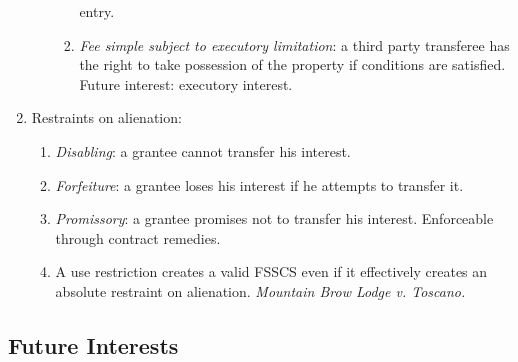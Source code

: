 \begin{enumerate}
\begin{enumerate}
\begin{enumerate}
            entry.
            \item \emph{Fee simple subject to executory limitation}: a third 
            party transferee has the right to take possession of the property 
            if conditions are satisfied. Future interest: executory interest.
        \end{enumerate}
    \end{enumerate}
    \item Restraints on alienation:
    \begin{enumerate}
        \item \emph{Disabling}: a grantee cannot transfer his interest.
        \item \emph{Forfeiture}: a grantee loses his interest if he attempts 
        to transfer it.
        \item \emph{Promissory}: a grantee promises not to transfer his 
        interest. Enforceable through contract remedies.
        \item A use restriction creates a valid FSSCS even if it effectively 
        creates an absolute restraint on alienation. \emph{Mountain Brow Lodge 
        v. Toscano.}
    \end{enumerate}
\end{enumerate}

\subsection{Future Interests}

